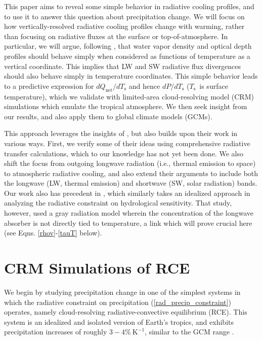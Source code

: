 \documentclass[9pt,twocolumn,twoside,lineno]{pnas-new}
\newcommand{\eqnref}[1]{(\ref{#1})}
\newcommand{\Qnet}{\ensuremath{Q_\mathrm{net}}}
\newcommand{\Kinverse}{\ensuremath{\mathrm{K^{-1}}}}
\newcommand{\Ts}{\ensuremath{T_\mathrm{s}}}
\begin{document}
This paper aims to reveal some simple behavior in radiative cooling profiles, and to use it to  answer this question about precipitation change. We will  focus on how vertically-resolved radiative cooling profiles change with warming, rather than focusing on radiative fluxes at the surface or top-of-atmosphere. In particular, we will argue, following \cite{simpson1928,ingram2010}, that water vapor density and optical depth profiles should behave simply when considered as functions of temperature as a vertical coordinate. This implies  that LW and SW radiative flux divergences should also behave simply in temperature coordinates. This simple behavior leads to a predictive expression for $d\Qnet/d\Ts$ and hence $dP/d\Ts$ (\Ts\ is surface temperature), which we validate with limited-area cloud-resolving model (CRM) simulations which emulate  the tropical atmosphere. We then seek insight from our results, and also apply them  to global climate models (GCMs). 


This approach leverages the insights of \cite{simpson1928, ingram2010}, but also builds upon their work in various ways. First, we verify some of their ideas using comprehensive radiative transfer calculations, which to our knowledge has not yet been done. We also shift the focus from outgoing longwave radiation (i.e., thermal emission to space) to atmospheric radiative cooling, and also extend their  arguments to include both the longwave (LW, thermal emission) and shortwave (SW, solar radiation) bands. Our work also has precedent in \cite{takahashi2009}, which similarly takes an idealized approach in analyzing the radiative constraint on hydrological sensitivity. That study, however,  used a gray radiation model wherein the concentration of the longwave absorber is not directly tied to temperature, a  link which will prove crucial here (see Eqns. \ref{rhov}-\ref{tauT} below).

\section{CRM Simulations of RCE}
We begin by studying precipitation change in one of the simplest systems in which the radiative constraint on precipitation \eqnref{rad_precip_constraint} operates, namely cloud-resolving radiative-convective equilibrium (RCE). This system is an idealized and isolated version of Earth's tropics, and exhibits precipitation increases of roughly $3 -4\%\ \Kinverse$, similar to the GCM range \cite{romps2011, muller2011b}.  
\end{document}
